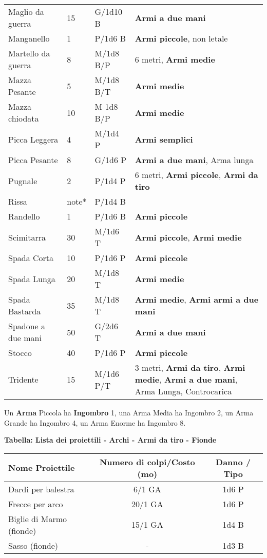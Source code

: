 \documentclass[12pt,a4paper,twoside,openany]{book}
\begin{document}
\begin{xltabular}{0.99\textwidth}{lllX}
Maglio da guerra& 15& G/1d10 B& \textbf{Armi a due mani}\\
Manganello& 1& P/1d6 B& \textbf{Armi piccole}, non letale\\
Martello da guerra& 8& M/1d8 B/P& 6 metri, \textbf{Armi medie}\\
Mazza Pesante& 5& M/1d8 B/T& \textbf{Armi medie}\\
Mazza chiodata& 10& M 1d8 B/P& \textbf{Armi medie}\\
Picca Leggera& 4& M/1d4 P&\textbf{Armi semplici}\\
Picca Pesante& 8& G/1d6 P&\textbf{Armi a due mani}, Arma lunga\\
Pugnale& 2& P/1d4 P& 6 metri, \textbf{Armi piccole}, \textbf{Armi da tiro}\\
Rissa& note*& P/1d4 B&\\
Randello& 1& P/1d6 B& \textbf{Armi piccole}\\
Scimitarra& 30 & M/1d6 T&\textbf{Armi piccole}, \textbf{Armi medie}\\
Spada Corta& 10 & P/1d6 P&\textbf{Armi piccole}\\
Spada Lunga& 20 & M/1d8 T&\textbf{Armi medie}\\
Spada Bastarda& 35 & M/1d8 T&\textbf{Armi medie}, \textbf{Armi armi a due mani}\\
Spadone a due mani& 50 & G/2d6 T&\textbf{Armi a due mani}\\
Stocco& 40 & P/1d6 P& \textbf{Armi piccole}\\
Tridente& 15 & M/1d6 P/T& 3 metri, \textbf{Armi da tiro}, \textbf{Armi medie}, \textbf{Armi a due mani}, Arma Lunga, Controcarica\\
\end{xltabular}

\medskip

Un \textbf{Arma} Piccola ha \textbf{Ingombro} 1, una Arma Media ha Ingombro 2, un Arma Grande ha Ingombro 4, un Arma Enorme ha Ingombro 8.

\medskip

\textbf{Tabella: Lista dei proiettili - Archi - Armi da tiro - Fionde}

\begin{tabular}{lcc}
\textbf{Nome Proiettile}& \textbf{Numero di colpi/Costo (mo)} & \textbf{Danno / Tipo}\\
\toprule
Dardi per balestra & 6/1 GA & 1d6 P\\
Frecce per arco& 20/1 GA & 1d6 P\\
Biglie di Marmo (fionde)& 15/1 GA & 1d4 B\\
Sasso (fionde)& -& 1d3 B\\
\end{tabular}
\end{document}
